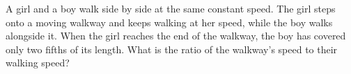 A girl and a boy walk side by side at the same constant speed. The girl steps onto a moving walkway and keeps walking at her speed, while the boy walks alongside it. When the girl reaches the end of the walkway, the boy has covered only two fifths of its length. What is the ratio of the walkway's speed to their walking speed?

